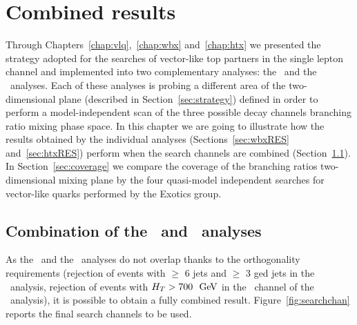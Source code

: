 \clearpage{\pagestyle{empty}\cleardoublepage}

\chapter{Combined results}\label{chap:results}

Through Chapters~\ref{chap:vlq},~\ref{chap:wbx} and~\ref{chap:htx}
we presented the strategy adopted for the searches of vector-like
top partners in the single lepton channel and implemented into
two complementary analyses: the \wbx\ and the \htx\ analyses.
Each of these analyses is probing a different
area of the two-dimensional plane (described in Section~\ref{sec:strategy}) 
defined in order to perform
a model-independent scan of the three possible decay channels branching ratio 
mixing phase space.
In this chapter we are going to illustrate how the results
obtained by the individual analyses (Sections~\ref{sec:wbxRES} 
and~\ref{sec:htxRES}) perform when the search channels are
combined (Section~\ref{sec:results_comb}).
In Section~\ref{sec:coverage} we compare
the coverage of the branching ratios two-dimensional
mixing plane by the four quasi-model independent
searches for vector-like quarks performed
by the Exotics group.


\section{Combination of the \wbx\ and \htx\ analyses}\label{sec:results_comb}

As the \wbx\ and the \htx\ analyses do not overlap
thanks to the orthogonality requirements (rejection of
events with $\geq$ 6 jets and $\geq$ 3 \btag ged jets
in the \wbx\ analysis, rejection of events with $H_T>700~\gev$
in the \chii\ channel of the \htx\ analysis), it is possible
to obtain a fully combined result. Figure~\ref{fig:searchchan}
reports the final search channels to be used.

